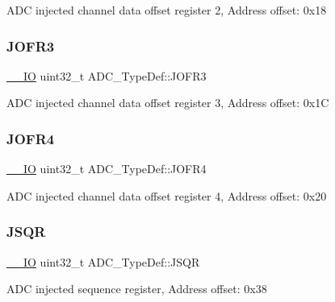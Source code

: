 A\+DC injected channel data offset register 2, Address offset\+: 0x18 \mbox{\label{struct_a_d_c___type_def_ae9c78142f6edf8122384263878d09015}} 
\subsubsection{\texorpdfstring{J\+O\+F\+R3}{JOFR3}}
{\footnotesize\ttfamily \hyperlink{core__sc300_8h_aec43007d9998a0a0e01faede4133d6be}{\+\_\+\+\_\+\+IO} uint32\+\_\+t A\+D\+C\+\_\+\+Type\+Def\+::\+J\+O\+F\+R3}

A\+DC injected channel data offset register 3, Address offset\+: 0x1C \mbox{\label{struct_a_d_c___type_def_a92f5c1a5aaa8b286317f923482e09d35}} 
\subsubsection{\texorpdfstring{J\+O\+F\+R4}{JOFR4}}
{\footnotesize\ttfamily \hyperlink{core__sc300_8h_aec43007d9998a0a0e01faede4133d6be}{\+\_\+\+\_\+\+IO} uint32\+\_\+t A\+D\+C\+\_\+\+Type\+Def\+::\+J\+O\+F\+R4}

A\+DC injected channel data offset register 4, Address offset\+: 0x20 \mbox{\label{struct_a_d_c___type_def_a5438a76a93ac1bd2526e92ef298dc193}} 
\subsubsection{\texorpdfstring{J\+S\+QR}{JSQR}}
{\footnotesize\ttfamily \hyperlink{core__sc300_8h_aec43007d9998a0a0e01faede4133d6be}{\+\_\+\+\_\+\+IO} uint32\+\_\+t A\+D\+C\+\_\+\+Type\+Def\+::\+J\+S\+QR}

A\+DC injected sequence register, Address offset\+: 0x38 \mbox{\label{struct_a_d_c___type_def_afdaf8050fb01739206a92c9ad610f396}} 
